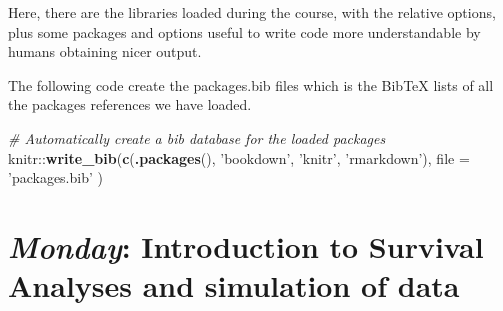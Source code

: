\documentclass[]{book}
\newenvironment{Shaded}{\begin{snugshade}}{\end{snugshade}}
\newcommand{\KeywordTok}[1]{\textcolor[rgb]{0.13,0.29,0.53}{\textbf{{#1}}}}
\newcommand{\DataTypeTok}[1]{\textcolor[rgb]{0.13,0.29,0.53}{{#1}}}
\newcommand{\FloatTok}[1]{\textcolor[rgb]{0.00,0.00,0.81}{{#1}}}
\newcommand{\StringTok}[1]{\textcolor[rgb]{0.31,0.60,0.02}{{#1}}}
\newcommand{\CommentTok}[1]{\textcolor[rgb]{0.56,0.35,0.01}{\textit{{#1}}}}
\newcommand{\OtherTok}[1]{\textcolor[rgb]{0.56,0.35,0.01}{{#1}}}
\newcommand{\NormalTok}[1]{{#1}}
\theoremstyle{definition}
\theoremstyle{definition}
\theoremstyle{definition}
\theoremstyle{remark}
\begin{document}
Here, there are the libraries loaded during the course, with the
relative options, plus some packages and options useful to write code
more understandable by humans obtaining nicer output.

\begin{Shaded}
\end{Shaded}

The following code create the packages.bib files which is the BibTeX
lists of all the packages references we have loaded.

\begin{Shaded}
\begin{Highlighting}[]
\CommentTok{# Automatically create a bib database for the loaded packages}
\NormalTok{knitr::}\KeywordTok{write_bib}\NormalTok{(}\KeywordTok{c}\NormalTok{(}\KeywordTok{.packages}\NormalTok{(), }\StringTok{'bookdown'}\NormalTok{, }\StringTok{'knitr'}\NormalTok{, }\StringTok{'rmarkdown'}\NormalTok{),}
  \DataTypeTok{file =} \StringTok{'packages.bib'}
\NormalTok{)}
\end{Highlighting}
\end{Shaded}

\chapter{\texorpdfstring{\emph{Monday}: Introduction to Survival
Analyses and simulation of
data}{Monday: Introduction to Survival Analyses and simulation of data}}\label{monday}
\end{document}
